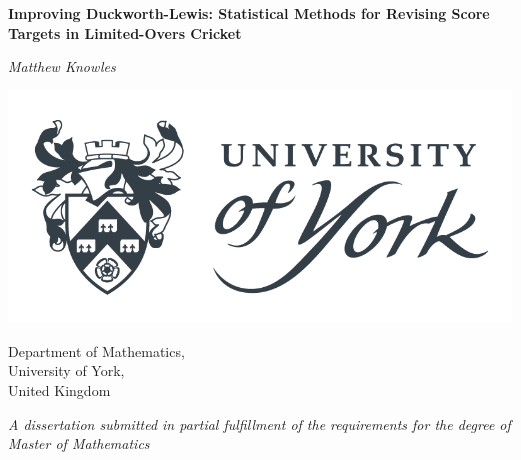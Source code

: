 \begin{titlepage}

    \begin{center}

        \vspace*{1.5cm}

        \textbf{\huge Improving Duckworth-Lewis: Statistical Methods for Revising Score Targets in Limited-Overs Cricket} 
        
        \vspace*{1.5cm}
        
        \textit{Matthew Knowles}

        \vspace*{1.5cm}
    
        \includegraphics[scale=0.5]{figures/uoylogo.png}
        
        \vspace*{1.5cm}
        
        Department of Mathematics, \\
        University of York, \\
        United Kingdom \\

        \vspace*{1.5cm}

        \textit{A dissertation submitted in partial fulfillment of the requirements for the degree of Master of Mathematics}
    \end{center}
    
\end{titlepage}